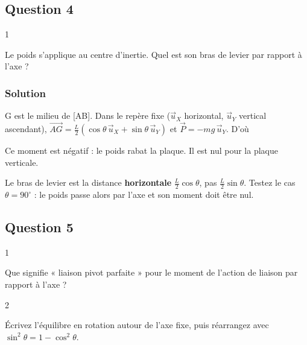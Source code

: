 \documentclass[11pt,a4paper]{article}
\newcommand{\equationajustee}[1]{%
  \sbox{\boiteequation}{$\displaystyle #1$}%
  \ifdim\wd\boiteequation>\linewidth
    \[\resizebox{\linewidth}{!}{\usebox{\boiteequation}}\]%
  \else
    \[#1\]%
  \fi}
\begin{document}
\hypertarget{question-4}{%
\subsection{Question 4}\label{question-4}}

\begin{indication}{1}

Le poids s'applique au centre d'inertie. Quel est son bras de levier par rapport à l'axe ?

\end{indication}

\hypertarget{solution-3}{%
\subsubsection{Solution}\label{solution-3}}

G est le milieu de {[}AB{]}. Dans le repère fixe (\(\vec u_X\) horizontal, \(\vec u_Y\) vertical ascendant), \(\overrightarrow{AG}=\frac L2(\cos\theta\,\vec u_X+\sin\theta\,\vec u_Y)\) et \(\vec P=-mg\,\vec u_Y\). D'où

\equationajustee{\boxed{\mathcal M_{\text{poids}}=-\frac12\,mgL\cos\theta}}

Ce moment est négatif : le poids rabat la plaque. Il est nul pour la plaque verticale.

\begin{piege}

Le bras de levier est la distance \textbf{horizontale} \(\frac L2\cos\theta\), pas \(\frac L2\sin\theta\). Testez le cas \(\theta=90^\circ\) : le poids passe alors par l'axe et son moment doit être nul.

\end{piege}

\hypertarget{question-5}{%
\subsection{Question 5}\label{question-5}}

\begin{indication}{1}

Que signifie « liaison pivot parfaite » pour le moment de l'action de liaison par rapport à l'axe ?

\end{indication}

\begin{indication}{2}

Écrivez l'équilibre en rotation autour de l'axe fixe, puis réarrangez avec \(\sin^2\theta=1-\cos^2\theta\).

\end{indication}
\end{document}
